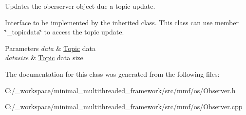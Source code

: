 Updates the oberserver object due a topic update. 

Interface to be implemented by the inherited class. This class can use member \char`\"{}\-\_\-topicdata\char`\"{} to access the topic update.


\begin{DoxyParams}{Parameters}
{\em data} & \hyperlink{class_topic}{Topic} data \\
\hline
{\em datasize} & \hyperlink{class_topic}{Topic} data size \\
\hline
\end{DoxyParams}


The documentation for this class was generated from the following files\-:\begin{DoxyCompactItemize}
\item 
C\-:/\-\_\-workspace/minimal\-\_\-multithreaded\-\_\-framework/src/mmf/os/Observer.\-h\item 
C\-:/\-\_\-workspace/minimal\-\_\-multithreaded\-\_\-framework/src/mmf/os/Observer.\-cpp\end{DoxyCompactItemize}
